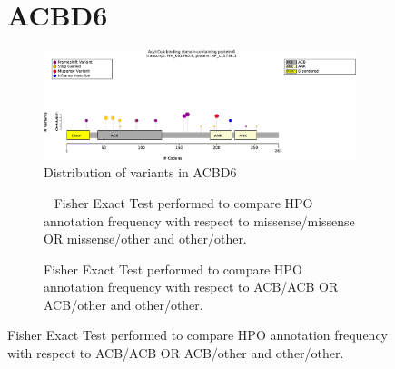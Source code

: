 \begin{figure}[htbp]
\section*{ACBD6}
\centering
\begin{subfigure}[b]{0.95\textwidth}
\centering
\includegraphics[width=\textwidth]{ img/ACBD6_protein_diagram.pdf} 
\captionsetup{justification=raggedright,singlelinecheck=false}
\caption{Distribution of variants in ACBD6}
\end{subfigure}

\vspace{2em}

\begin{subfigure}[b]{0.95\textwidth}
\centering
{}
\captionsetup{justification=raggedright,singlelinecheck=false}
\caption{         Fisher Exact Test performed to compare HPO annotation frequency with respect to missense/missense OR missense/other and other/other. }
\end{subfigure}

\vspace{2em}

\begin{subfigure}[b]{0.95\textwidth}
\centering
{}
\captionsetup{justification=raggedright,singlelinecheck=false}
\caption{Fisher Exact Test performed to compare HPO annotation frequency with respect to ACB/ACB OR ACB/other and other/other. }
\end{subfigure}


\end{figure}
